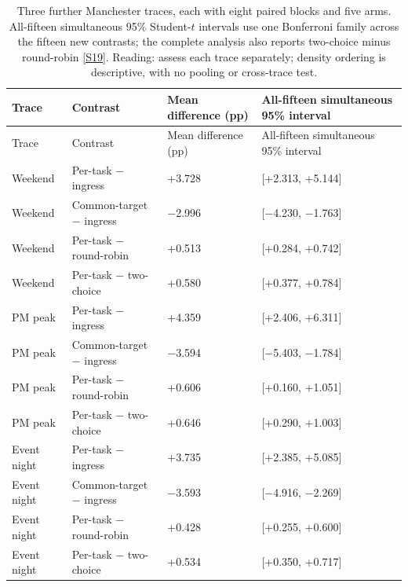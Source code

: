 \documentclass[12pt,a4paper]{article}
\begin{document}
\begingroup
\singlespacing\footnotesize\setlength{\tabcolsep}{3pt}
\renewcommand{\thetable}{7b}
\begin{xltabular}{\textwidth}{@{}YYYY@{}}
\caption[Three-trace simultaneous contrasts]{Three further Manchester traces, each with eight paired blocks and five arms. All-fifteen simultaneous 95\% Student-$t$ intervals use one Bonferroni family across the fifteen new contrasts; the complete analysis also reports two-choice minus round-robin \hyperref[source-s19]{[S19]}. Reading: assess each trace separately; density ordering is descriptive, with no pooling or cross-trace test.}\label{tab:7b} \\
\toprule
Trace & Contrast & Mean difference (pp) & All-fifteen simultaneous 95\% interval \\
\midrule\endfirsthead
\toprule
Trace & Contrast & Mean difference (pp) & All-fifteen simultaneous 95\% interval \\
\midrule\endhead
\bottomrule\endfoot
Weekend & Per-task \ensuremath{-} ingress & +3.728 & [+2.313, +5.144] \\
Weekend & Common-target \ensuremath{-} ingress & \ensuremath{-}2.996 & [\ensuremath{-}4.230, \ensuremath{-}1.763] \\
Weekend & Per-task \ensuremath{-} round-robin & +0.513 & [+0.284, +0.742] \\
Weekend & Per-task \ensuremath{-} two-choice & +0.580 & [+0.377, +0.784] \\
PM peak & Per-task \ensuremath{-} ingress & +4.359 & [+2.406, +6.311] \\
PM peak & Common-target \ensuremath{-} ingress & \ensuremath{-}3.594 & [\ensuremath{-}5.403, \ensuremath{-}1.784] \\
PM peak & Per-task \ensuremath{-} round-robin & +0.606 & [+0.160, +1.051] \\
PM peak & Per-task \ensuremath{-} two-choice & +0.646 & [+0.290, +1.003] \\
Event night & Per-task \ensuremath{-} ingress & +3.735 & [+2.385, +5.085] \\
Event night & Common-target \ensuremath{-} ingress & \ensuremath{-}3.593 & [\ensuremath{-}4.916, \ensuremath{-}2.269] \\
Event night & Per-task \ensuremath{-} round-robin & +0.428 & [+0.255, +0.600] \\
Event night & Per-task \ensuremath{-} two-choice & +0.534 & [+0.350, +0.717] \\
\end{xltabular}
\endgroup
\end{document}
